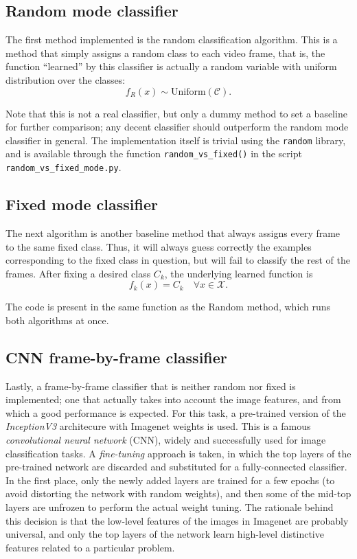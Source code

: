\documentclass[letterpaper, 10 pt, conference]{IEEEtran}
\begin{document}
\subsection{Random mode classifier}

The first method implemented is the random classification algorithm. This is a method that simply assigns a random class to each video frame, that is, the function ``learned'' by this classifier is actually a random variable with uniform distribution over the classes: \[
f_R(x) \sim \text{Uniform}(\mathcal C).\]

Note that this is not a real classifier, but only a dummy method to set a baseline for further comparison; any decent classifier should outperform the random mode classifier in general. The implementation itself is trivial using the \texttt{random} library, and is available through the function \texttt{random\_vs\_fixed()} in the script \texttt{random\_vs\_fixed\_mode.py}.

\subsection{Fixed mode classifier}

The next algorithm is another baseline method that always assigns every frame to the same fixed class. Thus, it will always guess correctly the examples corresponding to the fixed class in question, but will fail to classify the rest of the frames. After fixing a desired class $C_k$, the underlying learned function is
\[
f_k(x) = C_k \quad \forall x \in \mathcal X.
\]

The code is present in the same function as the Random method, which runs both algorithms at once.

\subsection{CNN frame-by-frame classifier}

Lastly, a frame-by-frame classifier that is neither random nor fixed is implemented; one that actually takes into account the image features, and from which a good performance is expected. For this task, a pre-trained version of the \textit{InceptionV3} architecure \cite{inception} with Imagenet weights is used. This is a famous \textit{convolutional neural network} (CNN), widely and successfully used for image classification tasks. A \textit{fine-tuning} approach is taken, in which the top layers of the pre-trained network are discarded and substituted for a fully-connected classifier. In the first place, only the newly added layers are trained for a few epochs (to avoid distorting the network with random weights), and then some of the mid-top layers are unfrozen to perform the actual weight tuning. The rationale behind this decision is that the low-level features of the images in Imagenet are probably universal, and only the top layers of the network learn high-level distinctive features related to a particular problem.
\end{document}
